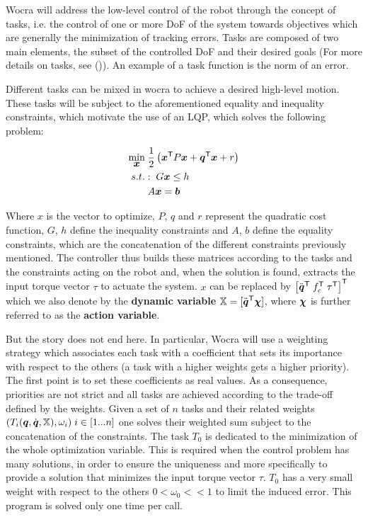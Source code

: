 Wocra will address the low-\/level control of the robot through the concept of tasks, i.\+e. the control of one or more DoF of the system towards objectives which are generally the minimization of tracking errors. Tasks are composed of two main elements, the subset of the controlled DoF and their desired goals (For more details on tasks, see ()). An example of a task function is the norm of an error.

Different tasks can be mixed in wocra to achieve a desired high-\/level motion. These tasks will be subject to the aforementioned equality and inequality constraints, which motivate the use of an L\+QP, which solves the following problem\+:

\begin{align*} \underset{\mbox{\boldmath${x}$}}{\text{min}} &\; \frac{1}{2} \left( \mbox{\boldmath${x}$}^{\mathsf{T}} P \mbox{\boldmath${x}$} + \mbox{\boldmath${q}$}^{\mathsf{T}}\mbox{\boldmath${x}$} + r \right) \\ s.t. &:\; G\mbox{\boldmath${x}$} \leq h \\ &\; A\mbox{\boldmath${x}$} = \mbox{\boldmath${b}$} \end{align*}

Where $ x $ is the vector to optimize, $ P $, $ q $ and $ r $ represent the quadratic cost function, $ G $, $ h $ define the inequality constraints and $ A $, $ b $ define the equality constraints, which are the concatenation of the different constraints previously mentioned. The controller thus builds these matrices according to the tasks and the constraints acting on the robot and, when the solution is found, extracts the input torque vector $ \tau $ to actuate the system. $ x $ can be replaced by $ \left[ \ddot{\mbox{\boldmath${q}$}} ^{\mathsf{T}} \; f_c ^{\mathsf{T}} \; \tau ^{\mathsf{T}} \right] ^{\mathsf{T}} $ which we also denote by the {\bfseries dynamic variable} $ \mathbb{X} = [\ddot{\mbox{\boldmath${q}$}}^{\mathsf{T}} \mbox{\boldmath${\chi}$}] $, where $ \mbox{\boldmath${\chi}$} $ is further referred to as the {\bfseries action variable}.

But the story does not end here. In particular, Wocra will use a weighting strategy which associates each task with a coefficient that sets its importance with respect to the others (a task with a higher weights gets a higher priority). The first point is to set these coefficients as real values. As a consequence, priorities are not strict and all tasks are achieved according to the trade-\/off defined by the weights. Given a set of $ n $ tasks and their related weights $ (T_i(\mbox{\boldmath${q}$}, \dot{\mbox{\boldmath${q}$}}, \mathbb{X}), \omega_i) \; i \in [1...n] $ one solves their weighted sum subject to the concatenation of the constraints. The task $ T_0 $ is dedicated to the minimization of the whole optimization variable. This is required when the control problem has many solutions, in order to ensure the uniqueness and more specifically to provide a solution that minimizes the input torque vector $ \tau $. $ T_0 $ has a very small weight with respect to the others $ 0 < \omega_0 << 1 $ to limit the induced error. This program is solved only one time per call.

